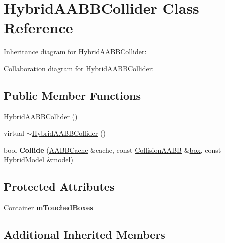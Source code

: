 \hypertarget{class_hybrid_a_a_b_b_collider}{\section{Hybrid\+A\+A\+B\+B\+Collider Class Reference}
\label{class_hybrid_a_a_b_b_collider}
}


Inheritance diagram for Hybrid\+A\+A\+B\+B\+Collider\+:


Collaboration diagram for Hybrid\+A\+A\+B\+B\+Collider\+:
\subsection*{Public Member Functions}
\begin{DoxyCompactItemize}
\item 
\hyperlink{class_hybrid_a_a_b_b_collider_a22e09dd587b3b0f63f9bce1a9b84bbed}{Hybrid\+A\+A\+B\+B\+Collider} ()
\item 
virtual \hyperlink{class_hybrid_a_a_b_b_collider_adc5ed4de439a7177b255d22e0da87347}{$\sim$\+Hybrid\+A\+A\+B\+B\+Collider} ()
\item 
\hypertarget{class_hybrid_a_a_b_b_collider_a166977ef6944a03cb4c1b3633e54216a}{bool {\bfseries Collide} (\hyperlink{struct_a_a_b_b_cache}{A\+A\+B\+B\+Cache} \&cache, const \hyperlink{class_collision_a_a_b_b}{Collision\+A\+A\+B\+B} \&\hyperlink{structbox}{box}, const \hyperlink{class_hybrid_model}{Hybrid\+Model} \&model)}\label{class_hybrid_a_a_b_b_collider_a166977ef6944a03cb4c1b3633e54216a}

\end{DoxyCompactItemize}
\subsection*{Protected Attributes}
\begin{DoxyCompactItemize}
\item 
\hypertarget{class_hybrid_a_a_b_b_collider_a29cebfbfa6395d4f4185acbb10ff1852}{\hyperlink{class_container}{Container} {\bfseries m\+Touched\+Boxes}}\label{class_hybrid_a_a_b_b_collider_a29cebfbfa6395d4f4185acbb10ff1852}

\end{DoxyCompactItemize}
\subsection*{Additional Inherited Members}


